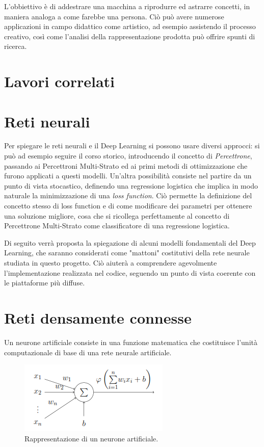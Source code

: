L'obbiettivo è di addestrare una macchina a riprodurre ed astrarre concetti, in maniera analoga a come farebbe una persona. Ciò può avere numerose applicazioni in campo didattico come artistico, ad esempio assistendo il processo creativo, così come l'analisi della rappresentazione prodotta può offrire spunti di ricerca.
\section{Lavori correlati}

\section{Reti neurali}
Per spiegare le reti neurali e il Deep Learning si possono usare diversi approcci: si può ad esempio seguire il corso storico, introducendo il concetto di \textit{Percettrone}, passando ai Percettroni Multi-Strato ed ai primi metodi di ottimizzazione che furono applicati a questi modelli. Un'altra possibilità consiste nel partire da un punto di vista stocastico, definendo una regressione logistica che implica in modo naturale la minimizzazione di una \textit{loss function}. Ciò permette la definizione del concetto stesso di loss function e di come modificare dei parametri per ottenere una soluzione migliore, cosa che si ricollega perfettamente al concetto di Percettrone Multi-Strato come classificatore di una regressione logistica.

Di seguito verrà proposta la spiegazione di alcuni modelli fondamentali del Deep Learning, che saranno considerati come "mattoni" costitutivi della rete neurale studiata in questo progetto. Ciò aiuterà a comprendere agevolmente l'implementazione realizzata nel codice, seguendo un punto di vista coerente con le piattaforme più diffuse.
\section{Reti densamente connesse} %
\label{sec:reti_densamente_connesse}
Un neurone artificiale consiste in una funzione matematica che costituisce l'unità computazionale di base di una rete neurale artificiale.
\begin{figure}[ht]
	\centering
	\includegraphics{img/artificial_neuron.png}
	\caption{Rappresentazione di un neurone artificiale.}
	\label{fig:1.2}
\end{figure}

